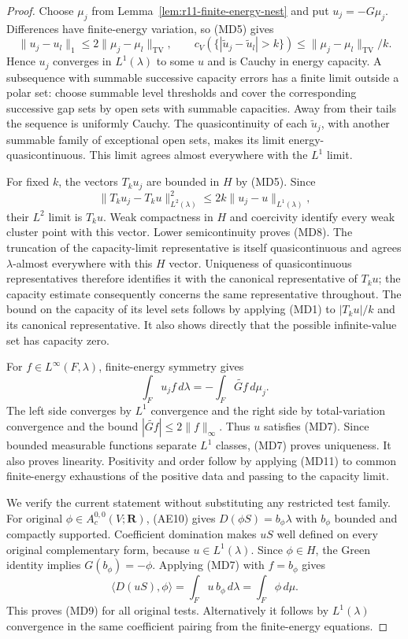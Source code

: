\begin{proof}
Choose $\mu_j$ from Lemma~\ref{lem:r11-finite-energy-nest} and
put $u_j=-G\mu_j$.  Differences have finite-energy variation,
so (MD5) gives
\[
 \|u_j-u_l\|_1\leq2\|\mu_j-\mu_l\|_{\mathrm{TV}},\qquad
 c_V(\{|\widetilde u_j-\widetilde u_l|>k\})
       \leq\|\mu_j-\mu_l\|_{\mathrm{TV}}/k.
 \tag{MD11}
\]
Hence $u_j$ converges in $L^1(\lambda)$ to some $u$ and is
Cauchy in energy capacity.  A subsequence with summable
successive capacity errors has a finite limit outside a polar
set: choose summable level thresholds and cover the corresponding
successive gap sets by open sets with summable capacities.
Away from their tails the sequence is uniformly Cauchy.
The quasicontinuity of each $\widetilde u_j$, with another
summable family of exceptional open sets, makes its limit
energy-quasicontinuous.  This limit agrees almost everywhere
with the $L^1$ limit.

For fixed $k$, the vectors $T_ku_j$ are bounded in $H$ by
(MD5).  Since
\[
 \|T_ku_j-T_ku\|_{L^2(\lambda)}^2
                         \leq2k\|u_j-u\|_{L^1(\lambda)},
\]
their $L^2$ limit is $T_ku$.  Weak compactness in $H$ and
coercivity identify every weak cluster point with this vector.
Lower semicontinuity proves (MD8).
The truncation of the capacity-limit representative is itself
quasicontinuous and agrees $\lambda$-almost everywhere with
this $H$ vector.  Uniqueness of quasicontinuous representatives
therefore identifies it with the canonical representative of
$T_ku$; the capacity estimate consequently concerns the same
representative throughout.
The bound on the capacity of its level sets follows by applying
(MD1) to $|T_ku|/k$ and its canonical representative.
It also shows directly that the possible infinite-value set
has capacity zero.

For $f\in L^\infty(F,\lambda)$, finite-energy symmetry gives
\[
                  \int_Fu_j f\,d\lambda
                      =-\int_F\widetilde{Gf}\,d\mu_j .
\]
The left side converges by $L^1$ convergence and the right
side by total-variation convergence and the bound
$|\widetilde{Gf}|\leq2\|f\|_\infty$.
Thus $u$ satisfies (MD7).  Since bounded measurable functions
separate $L^1$ classes, (MD7) proves uniqueness.
It also proves linearity.  Positivity and order follow by
applying (MD11) to common finite-energy exhaustions of the
positive data and passing to the capacity limit.

We verify the current statement without substituting any
restricted test family.  For original
$\phi\in A_c^{0,0}(V;\mathbf R)$, (AE10) gives
$D(\phi S)=b_\phi\lambda$ with $b_\phi$ bounded and compactly
supported.  Coefficient domination makes $uS$ well defined
on every original complementary form, because $u\in L^1(\lambda)$.
Since $\phi\in H$, the Green identity implies
$G(b_\phi)=-\phi$.  Applying (MD7) with $f=b_\phi$ gives
\[
 \langle D(uS),\phi\rangle
        =\int_Fu\,b_\phi\,d\lambda
        =\int_F\phi\,d\mu .
 \tag{MD12}
\]
This proves (MD9) for all original tests.  Alternatively it
follows by $L^1(\lambda)$ convergence in the same coefficient
pairing from the finite-energy equations.


\end{proof}
